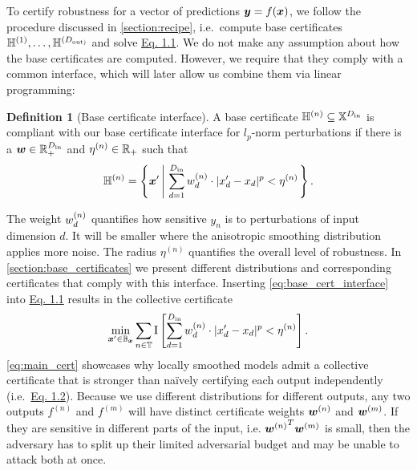 \documentclass{article} %
\theoremstyle{plain}
\theoremstyle{definition}
\newtheorem{definition}[theorem]{Definition}
\theoremstyle{remark}
\begin{document}
To certify robustness for a vector of predictions ${\bm{y}} = f({\bm{x}})$, we follow the procedure discussed in \autoref{section:recipe},
i.e.~compute
base certificates ${\mathbb{H}}^{(1)}, \dots, {\mathbb{H}}^{(D_\mathrm{out)}}$ and solve
\hyperref[eq:recipe]{Eq. 1.1}.
We do not make any assumption about how the base certificates are computed.
However, we require that they comply with a common interface, which will later allow us 
combine them via linear programming:
\begin{definition}[Base certificate interface]\label{definition:interface}
	A base certificate ${\mathbb{H}}^{(n)} \subseteq {\mathbb{X}}^{D_\mathrm{in}}$ is compliant with our base certificate interface for $l_p$-norm perturbations if there is a ${\bm{w}} \in {\mathbb{R}}^{D_\mathrm{in}}_{+}$ and $\eta^{(n)} \in {\mathbb{R}}_{+}$ such that
	\begin{equation}\label{eq:base_cert_interface}
		\sH^{(n)} = \left\{\vx'
		\left| \
		\smashoperator{\sum_{d=1}^{D_\mathrm{in}}}
		\evw_{d}^{(n)} \cdot |\evx'_d - \evx_d|^p < \eta^{(n)}
		\right.
		\right\}.
	\end{equation}
\end{definition}
The weight ${w}_d^{(n)}$ quantifies how sensitive $y_n$ is to perturbations of input dimension $d$.
It will be smaller where the anisotropic smoothing distribution applies more noise.
The radius $\eta^{(n)}$ quantifies the overall level of robustness.
In \autoref{section:base_certificates} we present different distributions and corresponding certificates that comply with this interface.
Inserting \autoref{eq:base_cert_interface} into \hyperref[eq:recipe]{Eq. 1.1} results in the collective certificate
\begin{equation}\label{eq:main_cert}
	\min_{{\bm{x}}' \in {\mathbb{B}}_{\bm{x}}} \sum_{n \in {\mathbb{T}}} \mathrm{I}\left[
	\sum_{d=1}^{D_\mathrm{in}}
	{w}_{d}^{(n)} \cdot |{x}'_d - {x}_d|^p < \eta^{(n)}
	\right].
\end{equation}
\autoref{eq:main_cert}
showcases why locally smoothed models admit a collective certificate that is stronger than na\"ively certifying each output independently (i.e.~\hyperref[eq:recipe]{Eq. 1.2}).
Because we use different distributions for different outputs, any two outputs $f^{(n)}$ and $f^{(m)}$
will have distinct certificate weights ${\bm{w}}^{(n)}$ and ${\bm{w}}^{(m)}$.
If they are sensitive in different parts of the input, i.e. ${{\bm{w}}^{(n)}}^T {\bm{w}}^{(m)}$ is small, then the adversary has to split up their  limited adversarial budget and may be unable to attack both at once.
\end{document}
